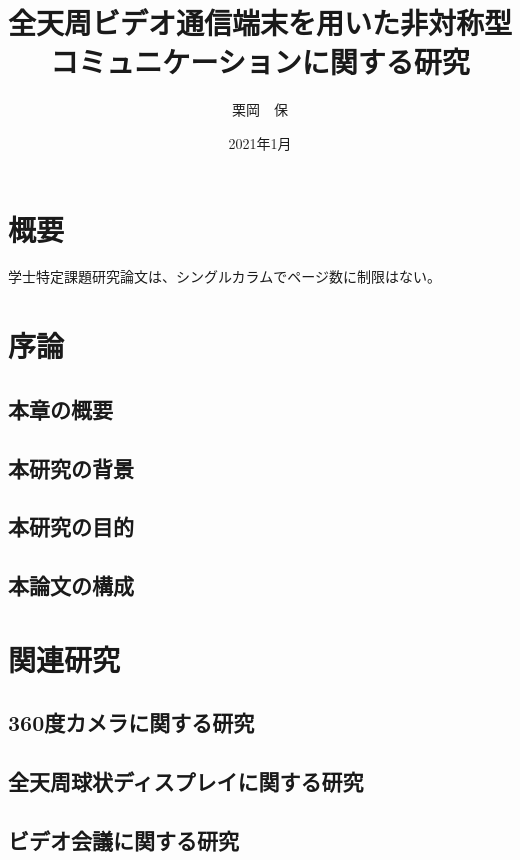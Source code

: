 \documentclass[a4j,11pt,oneside,openany,report]{jsbook}
\title{全天周ビデオ通信端末を用いた非対称型コミュニケーションに関する研究}
\author{栗岡　保}
\affiliation{東京工業大学\\情報理工学院\\情報工学系}
\date{2021年1月}
\begin{document}
\frontmatter
\maketitle

\chapter{概要}
学士特定課題研究論文は、シングルカラムでページ数に制限はない。

\tableofcontents
\listoffigures
\listoftables


\mainmatter
\chapter{序論}

\section{本章の概要}
\section{本研究の背景}
\section{本研究の目的}
\section{本論文の構成}

\chapter{関連研究}
\section{360度カメラに関する研究}
\section{全天周球状ディスプレイに関する研究}
\section{ビデオ会議に関する研究}
\end{document}
